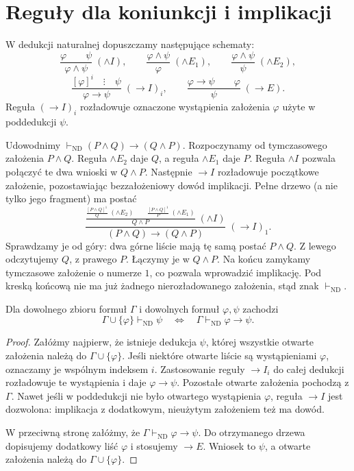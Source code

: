 \section{Reguły dla koniunkcji i implikacji}
\begin{definicja}\label{def:nd-rules-conj-imp}
W dedukcji naturalnej dopuszczamy następujące schematy:
\[
\frac{\varphi\qquad\psi}{\varphi\land\psi}\;(\land I),
\qquad
\frac{\varphi\land\psi}{\varphi}\;(\land E_1),
\qquad
\frac{\varphi\land\psi}{\psi}\;(\land E_2),
\]
\[
\frac{[\varphi]^i\quad\vdots\quad\psi}
     {\varphi\to\psi}\;(\to I)_i,
\qquad
\frac{\varphi\to\psi\qquad\varphi}{\psi}\;(\to E).
\]
Reguła $(\to I)_i$ rozładowuje oznaczone wystąpienia
założenia $\varphi$ użyte w poddedukcji $\psi$.
\end{definicja}
\begin{przyklad}\label{ex:nd-conj-swap}
Udowodnimy $\vdash_{\mathrm{ND}}(P\land Q)\to(Q\land P)$.
Rozpoczynamy od tymczasowego założenia $P\land Q$.
Reguła $\land E_2$ daje $Q$, a reguła $\land E_1$ daje $P$.
Reguła $\land I$ pozwala połączyć te dwa wnioski w $Q\land P$.
Następnie $\to I$ rozładowuje początkowe założenie,
pozostawiając bezzałożeniowy dowód implikacji.
Pełne drzewo (a nie tylko jego fragment) ma postać
\[
\frac{\displaystyle
 \frac{
 \frac{[P\land Q]^1}{Q}\;(\land E_2)
 \qquad
 \frac{[P\land Q]^1}{P}\;(\land E_1)
 }{Q\land P}\;(\land I)
}{(P\land Q)\to(Q\land P)}\;(\to I)_1.
\]
Sprawdzamy je od góry: dwa górne liście mają tę samą postać $P\land Q$.
Z lewego odczytujemy $Q$, z prawego $P$. Łączymy je w $Q\land P$.
Na końcu zamykamy tymczasowe założenie o numerze $1$,
co pozwala wprowadzić implikację. Pod kreską końcową nie ma
już żadnego nierozładowanego założenia, stąd znak $\vdash_{\mathrm{ND}}$.
\end{przyklad}

\begin{twierdzenie}
\label{thm:nd-deduction}
Dla dowolnego zbioru formuł $\Gamma$ i dowolnych formuł
$\varphi,\psi$ zachodzi
\[
\Gamma\cup\{\varphi\}\vdash_{\mathrm{ND}}\psi
\quad\Longleftrightarrow\quad
\Gamma\vdash_{\mathrm{ND}}\varphi\to\psi.
\]
\end{twierdzenie}
\begin{proof}
Załóżmy najpierw, że istnieje dedukcja $\psi$,
której wszystkie otwarte założenia należą do
$\Gamma\cup\{\varphi\}$. Jeśli niektóre otwarte liście
są wystąpieniami $\varphi$, oznaczamy je wspólnym indeksem
$i$. Zastosowanie reguły $\to I_i$ do całej dedukcji
rozładowuje te wystąpienia i daje $\varphi\to\psi$.
Pozostałe otwarte założenia pochodzą z $\Gamma$.
Nawet jeśli w poddedukcji nie było otwartego wystąpienia
$\varphi$, reguła $\to I$ jest dozwolona:
implikacja z dodatkowym, nieużytym założeniem też ma dowód.

W przeciwną stronę załóżmy, że
$\Gamma\vdash_{\mathrm{ND}}\varphi\to\psi$.
Do otrzymanego drzewa dopisujemy dodatkowy liść
$\varphi$ i stosujemy $\to E$. Wniosek to $\psi$,
a otwarte założenia należą do $\Gamma\cup\{\varphi\}$.
\end{proof}

